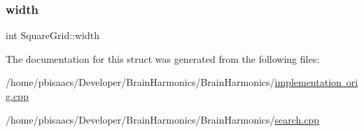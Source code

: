 \subsubsection{\texorpdfstring{width}{width}}
{\footnotesize\ttfamily int Square\+Grid\+::width}



The documentation for this struct was generated from the following files\+:\begin{DoxyCompactItemize}
\item 
/home/pbisaacs/\+Developer/\+Brain\+Harmonics/\+Brain\+Harmonics/\mbox{\hyperlink{implementation_01orig_8cpp}{implementation orig.\+cpp}}\item 
/home/pbisaacs/\+Developer/\+Brain\+Harmonics/\+Brain\+Harmonics/\mbox{\hyperlink{search_8cpp}{search.\+cpp}}\end{DoxyCompactItemize}
